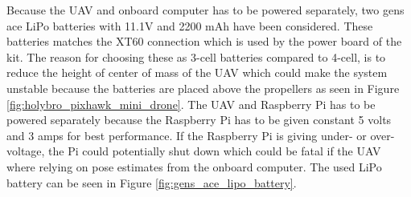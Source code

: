\documentclass[../Head/report.tex]{subfiles}
\begin{document}
Because the UAV and onboard computer has to be powered separately, two gens ace LiPo batteries with 11.1V and 2200 mAh have been considered. These batteries matches the XT60 connection which is used by the power board of the kit. The reason for choosing these as 3-cell batteries compared to 4-cell, is to reduce the height of center of mass of the UAV which could make the system unstable because the batteries are placed above the propellers as seen in Figure \ref{fig:holybro_pixhawk_mini_drone}. The UAV and Raspberry Pi has to be powered separately because the Raspberry Pi has to be given constant 5 volts and 3 amps for best performance. If the Raspberry Pi is giving under- or over-voltage, the Pi could potentially shut down which could be fatal if the UAV where relying on pose estimates from the onboard computer. The used LiPo battery can be seen in Figure \ref{fig:gens_ace_lipo_battery}.  
\end{document}
